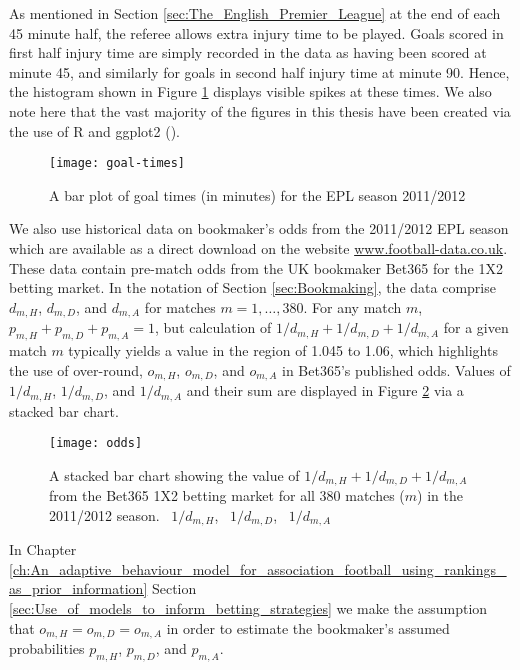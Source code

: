 As mentioned in Section \ref{sec:The_English_Premier_League} at the end of each 45 minute half, the referee allows extra
injury time to be played. Goals scored in first half injury time are simply recorded in the data as having been scored
at minute 45, and similarly for goals in second half injury time at minute 90. Hence, the histogram shown in Figure
\ref{goalTimes} displays visible spikes at these times. We also note here that the vast majority of the figures in this
thesis have been created via the use of R and ggplot2 (\cite{R, ggplot2}).
\begin{figure}
\begin{center}
\texttt{[image: goal-times]}
\caption{A bar plot of goal times (in minutes) for the EPL season 2011/2012}
\label{goalTimes}
\end{center} 
\end{figure}

We also use historical data on bookmaker's odds from the 2011/2012 \gls{EPL} season which are available as a direct
download on the website \url{www.football-data.co.uk}. These data contain pre-match odds from the UK bookmaker Bet365
for the 1X2 betting market. In the notation of Section \ref{sec:Bookmaking}, the data comprise \(d_{m, H}\), \(d_{m,
D}\), and \(d_{m, A}\) for matches \(m = 1, \ldots, 380\). For any match \(m\), \(p_{m, H} + p_{m, D} + p_{m, A} = 1\),
but calculation of \(1/d_{m, H} + 1/d_{m, D} + 1/d_{m, A}\) for a given match \(m\) typically yields a value in the
region of 1.045 to 1.06, which highlights the use of over-round, \(o_{m, H}\), \(o_{m, D}\), and \(o_{m, A}\) in
Bet365's published odds. Values of \(1/d_{m, H}\), \(1/d_{m, D}\), and \(1/d_{m, A}\) and their sum are displayed in
Figure \ref{odds} via a stacked bar chart.
\begin{figure}
\begin{center}
\texttt{[image: odds]}
\caption{A stacked bar chart showing the value of \(1/d_{m, H} + 1/d_{m, D} + 1/d_{m, A}\) from the Bet365 1X2 betting
market for all 380 matches (\(m\)) in the 2011/2012 season. \protect\blueBox\ \(1/d_{m, H}\), \protect\redBox\ \(1/d_{m,
D}\), \protect\greenBox\ \(1/d_{m, A}\)}
\label{odds}
\end{center}
\end{figure}
In Chapter \ref{ch:An_adaptive_behaviour_model_for_association_football_using_rankings_as_prior_information} Section
\ref{sec:Use_of_models_to_inform_betting_strategies} we make the assumption that \(o_{m, H} = o_{m, D} = o_{m, A}\) in
order to estimate the bookmaker's assumed probabilities \(p_{m, H}\), \(p_{m, D}\), and \(p_{m, A}\).

